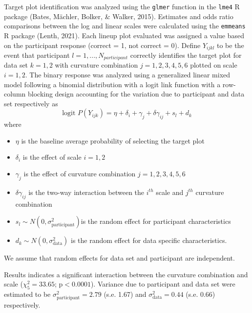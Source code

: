 \documentclass[print]{nuthesis}
\begin{document}
Target plot identification was analyzed using the \texttt{glmer} function in the \texttt{lme4} R package (Bates, Mächler, Bolker, \& Walker, 2015).
Estimates and odds ratio comparisons between the log and linear scales were calculated using the \texttt{emmeans} R package (Lenth, 2021).
Each lineup plot evaluated was assigned a value based on the participant response (correct = 1, not correct = 0).
Define \(Y_{ijkl}\) to be the event that participant \(l = 1,...,N_{participant}\) correctly identifies the target plot for data set \(k = 1,2\) with curvature combination \(j = 1,2,3,4,5,6\) plotted on scale \(i = 1,2\).
The binary response was analyzed using a generalized linear mixed model following a binomial distribution with a logit link function with a row-column blocking design accounting for the variation due to participant and data set respectively as
\begin{equation}
\text{logit }P(Y_{ijk}) = \eta + \delta_i + \gamma_j + \delta \gamma_{ij} + s_l + d_k
\end{equation}
\noindent where

\begin{itemize}
\item $\eta$ is the baseline average probability of selecting the target plot
\item $\delta_i$ is the effect of scale $i = 1,2$
\item $\gamma_j$ is the effect of curvature combination $j = 1,2,3,4,5,6$
\item $\delta\gamma_{ij}$ is the two-way interaction between the $i^{th}$ scale and $j^{th}$ curvature combination
\item $s_l \sim N(0,\sigma^2_\text{participant})$is the random effect for participant characteristics
\item $d_k \sim N(0,\sigma^2_{\text{data}})$ is the random effect for data specific characteristics. 
\end{itemize}

\noindent We assume that random effects for data set and participant are independent.

Results indicates a significant interaction between the curvature combination and scale (\(\chi^2_5 = 33.65\); \(\text{p} <0.0001\)). Variance due to participant and data set were estimated to be \(\sigma^2_{\text{participant}} = 2.79\) (s.e. 1.67) and \(\sigma^2_{\text{data}} = 0.44\) (s.e. 0.66) respectively.
\end{document}
